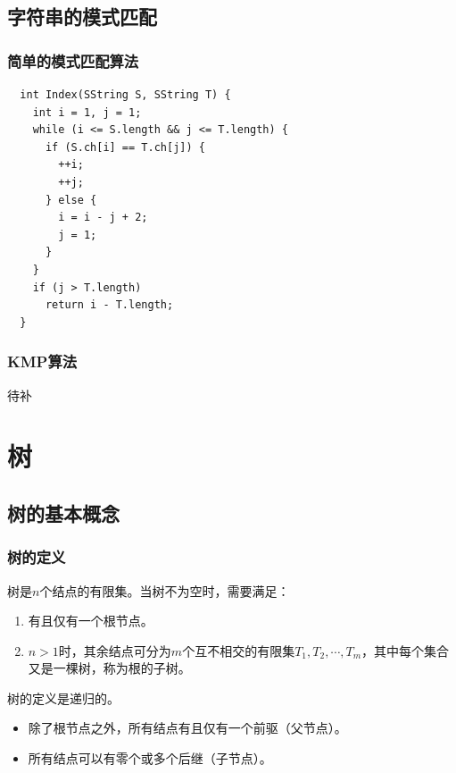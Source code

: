 \documentclass[12pt, a4paper, oneside]{ctexart}
\begin{document}
\subsection{字符串的模式匹配}

\subsubsection{简单的模式匹配算法}

\begin{lstlisting}
  int Index(SString S, SString T) {
    int i = 1, j = 1;
    while (i <= S.length && j <= T.length) {
      if (S.ch[i] == T.ch[j]) {
        ++i;
        ++j;
      } else {
        i = i - j + 2;
        j = 1;
      }
    }
    if (j > T.length)
      return i - T.length;
  }
\end{lstlisting}

\subsubsection{KMP算法}

待补

\section{树}

\subsection{树的基本概念}

\subsubsection{树的定义}

树是$n$个结点的有限集。当树不为空时，需要满足：
\begin{enumerate}
  \item 有且仅有一个根节点。
  \item $n>1$时，其余结点可分为$m$个互不相交的有限集$T_1, T_2, \cdots, T_m$，其中每个集合又是一棵树，称为根的子树。
\end{enumerate}

树的定义是递归的。

\begin{itemize}
  \item 除了根节点之外，所有结点有且仅有一个前驱（父节点）。
  \item 所有结点可以有零个或多个后继（子节点）。
\end{itemize}
\end{document}
